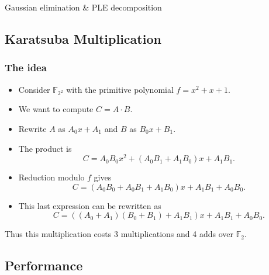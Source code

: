 \documentclass[11pt]{beamer}
\newcommand{\field}[1]{\mathbb{#1}}
\newcommand{\F}{\ensuremath{\field{F}}\xspace}
\begin{document}
\begin{frame}{Gaussian elimination \& PLE decomposition}

\begin{algorithm}[H]
\end{algorithm}
\end{frame}


\subsection{Karatsuba Multiplication}

\begin{frame}
\frametitle{The idea}
\begin{itemize}
 \item Consider $\F_{2^2}$ with the primitive polynomial $f = x^2 + x + 1$.
 \item We want to compute $C = A \cdot B$. 
 \item Rewrite $A$ as $ A_0x + A_1$ and $B$ as $ B_0x + B_1$. 
 \item The product is $$C = A_0B_0x^2 + (A_0B_1 + A_1B_0)x + A_1B_1.$$
 \item Reduction modulo $f$ gives $$C = (A_0B_0 + A_0B_1 + A_1B_0)x + A_1B_1 + A_0B_0.$$
 \item  This last expression can be rewritten as $$C = ((A_0 + A_1)(B_0 + B_1) + A_1B_1)x + A_1B_1 + A_0B_0.$$
\end{itemize}
 
Thus this multiplication costs 3 multiplications and 4 adds over $\F_2$.

\end{frame}

\subsection{Performance}
\end{document}
